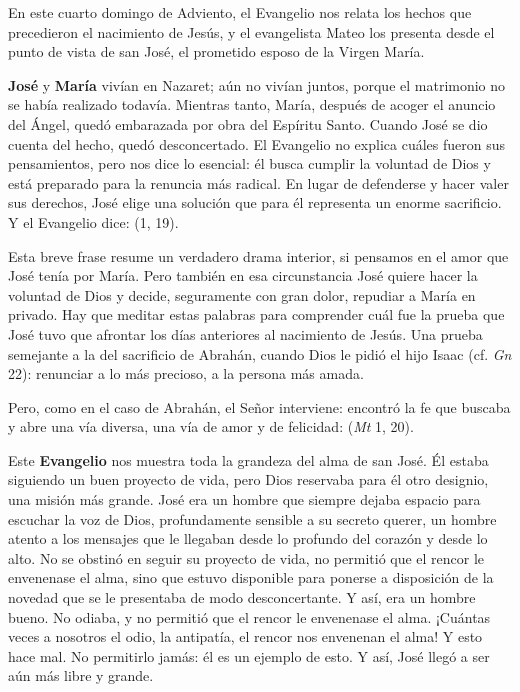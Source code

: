 				\begin{body}
					En este cuarto domingo de Adviento, el Evangelio nos relata los hechos que precedieron el nacimiento de Jesús, y el evangelista Mateo los presenta desde el punto de vista de san José, el prometido esposo de la Virgen María.
					
					\textbf{José} y \textbf{María} vivían en Nazaret; aún no vivían juntos, porque el matrimonio no se había realizado todavía. Mientras tanto, María, después de acoger el anuncio del Ángel, quedó embarazada por obra del Espíritu Santo. Cuando José se dio cuenta del hecho, quedó desconcertado. El Evangelio no explica cuáles fueron sus pensamientos, pero nos dice lo esencial: él busca cumplir la voluntad de Dios y está preparado para la renuncia más radical. En lugar de defenderse y hacer valer sus derechos, José elige una solución que para él representa un enorme sacrificio. Y el Evangelio dice:  (1, 19).
					
					Esta breve frase resume un verdadero drama interior, si pensamos en el amor que José tenía por María. Pero también en esa circunstancia José quiere hacer la voluntad de Dios y decide, seguramente con gran dolor, repudiar a María en privado. Hay que meditar estas palabras para comprender cuál fue la prueba que José tuvo que afrontar los días anteriores al nacimiento de Jesús. Una prueba semejante a la del sacrificio de Abrahán, cuando Dios le pidió el hijo Isaac (cf. \emph{Gn} 22): renunciar a lo más precioso, a la persona más amada.
					
					Pero, como en el caso de Abrahán, el Señor interviene: encontró la fe que buscaba y abre una vía diversa, una vía de amor y de felicidad:  (\emph{Mt} 1, 20).
					
					Este \textbf{Evangelio} nos muestra toda la grandeza del alma de san José. Él estaba siguiendo un buen proyecto de vida, pero Dios reservaba para él otro designio, una misión más grande. José era un hombre que siempre dejaba espacio para escuchar la voz de Dios, profundamente sensible a su secreto querer, un hombre atento a los mensajes que le llegaban desde lo profundo del corazón y desde lo alto. No se obstinó en seguir su proyecto de vida, no permitió que el rencor le envenenase el alma, sino que estuvo disponible para ponerse a disposición de la novedad que se le presentaba de modo desconcertante. Y así, era un hombre bueno. No odiaba, y no permitió que el rencor le envenenase el alma. ¡Cuántas veces a nosotros el odio, la antipatía, el rencor nos envenenan el alma! Y esto hace mal. No permitirlo jamás: él es un ejemplo de esto. Y así, José llegó a ser aún más libre y grande.
					

\end{body}
